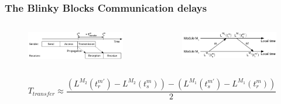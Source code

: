 \begin{frame}\frametitle{The Blinky Blocks Communication delays}

\begin{center}
	\begin{columns}[c]
		\begin{column}{.50\textwidth}
			\begin{figure}
				\centering
				\includegraphics[width=\linewidth]{fig/synchronization/network-delay}
				\label{fig:communication-delays}
			\end{figure}
		\end{column}
		\begin{column}{.50\textwidth}
			\begin{figure}
				\centering
				\includegraphics[width=\linewidth]{fig/synchronization/two-way}
				\label{fig:two-way}
			\end{figure}
			
		\end{column}
	\end{columns}
\end{center}

{
	\[ T_{transfer} \approx \frac{(L^{M_2}(t_r^{m'}) - L^{M_2}(t_s^m)) - (L^{M_1}(t_s^{m'})-L^{M_1}(t_r^m))}{2}\]
}


\end{frame}
